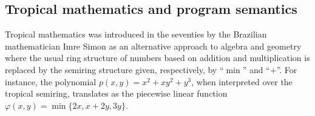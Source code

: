 %
%
%



\subsection{Tropical mathematics and program semantics } 


Tropical mathematics was introduced in the seventies by the Brazilian mathematician Imre Simon \cite{Simon} as an alternative approach to algebra and geometry where the usual ring structure of numbers based on addition and multiplication is replaced by the semiring structure given, respectively, by ``$\min$'' and ``$+$''.
%
%
For instance, the polynomial $p(x,y)=x^{2}+xy^{2}+y^{3}$, when interpreted over the tropical semiring, translates as the piecewise linear function
$
\varphi(x,y)=\min\{2x, x+2y, 3y\}
$.

